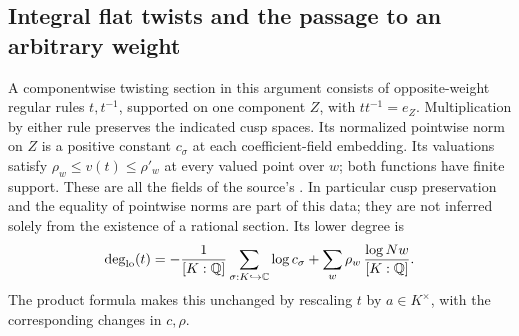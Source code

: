 \subsection{Integral flat twists and the passage to an arbitrary weight}
\label{subsec:ftb-flat-twists-weight-reduction}

A componentwise twisting section in this argument consists of
opposite-weight regular rules \(t,t^{-1}\), supported on one
component \(Z\), with \(tt^{-1}=e_Z\).
Multiplication by either rule preserves the indicated cusp spaces.
Its normalized pointwise norm on \(Z\) is a positive constant
\(c_\sigma\) at each coefficient-field embedding.
Its valuations satisfy
\(\rho_w\le v(t)\le\rho'_w\) at every valued point over \(w\);
both functions have finite support.
These are all the fields of the source's .
In particular cusp preservation and the equality of pointwise
norms are part of this data; they are not inferred solely from the
existence of a rational section.
Its lower degree is
\[
 \deg_{\rm lo}(t)=
   -\frac1{[K:\mathbb Q]}\sum_{\sigma:K\hookrightarrow\mathbb C}
                           \log c_\sigma
   +\sum_w\rho_w\,\frac{\log Nw}{[K:\mathbb Q]} .
\]
The product formula makes this unchanged by rescaling \(t\) by
\(a\in K^\times\), with the corresponding changes in \(c,\rho\).

